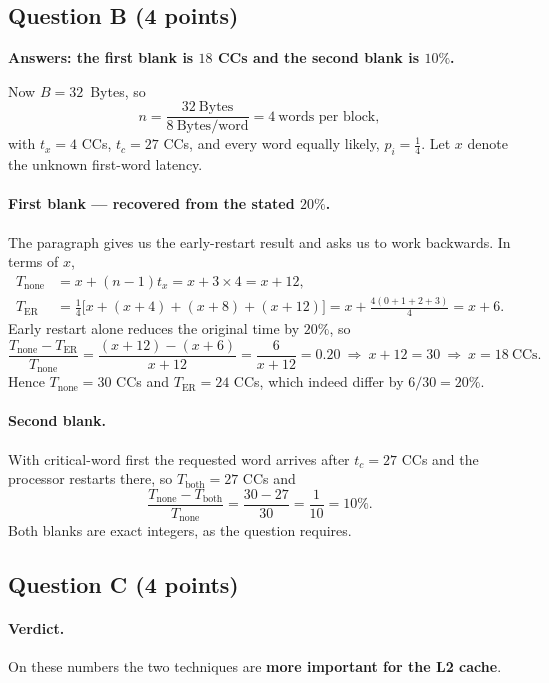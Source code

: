 \subsection*{Question B (4 points)}

\textbf{Answers: the first blank is $18$ CCs and the second blank is $10\%$.}

Now $B=32$~Bytes, so
\[
  n=\frac{32\ \text{Bytes}}{8\ \text{Bytes/word}}=4\ \text{words per block},
\]
with $t_x=4$ CCs, $t_c=27$ CCs, and every word equally likely, $p_i=\tfrac14$. Let $x$
denote the unknown first-word latency.

\paragraph{First blank --- recovered from the stated $20\%$.}
The paragraph gives us the early-restart result and asks us to work backwards. In terms
of $x$,
\begin{align*}
  T_{\text{none}} &= x+(n-1)t_x = x+3\times 4 = x+12,\\
  T_{\text{ER}}   &= \frac14\bigl[x+(x+4)+(x+8)+(x+12)\bigr]
                   = x+\frac{4(0+1+2+3)}{4} = x+6 .
\end{align*}
Early restart alone reduces the original time by $20\%$, so
\[
  \frac{T_{\text{none}}-T_{\text{ER}}}{T_{\text{none}}}
  =\frac{(x+12)-(x+6)}{x+12}
  =\frac{6}{x+12}=0.20
  \ \Longrightarrow\ x+12=30
  \ \Longrightarrow\ \boxed{x=18\ \text{CCs}} .
\]
Hence $T_{\text{none}}=30$ CCs and $T_{\text{ER}}=24$ CCs, which indeed differ by
$6/30=20\%$.

\paragraph{Second blank.}
With critical-word first the requested word arrives after $t_c=27$ CCs and the
processor restarts there, so $T_{\text{both}}=27$ CCs and
\[
  \frac{T_{\text{none}}-T_{\text{both}}}{T_{\text{none}}}
  =\frac{30-27}{30}=\frac{1}{10}=\boxed{10\%} .
\]
Both blanks are exact integers, as the question requires.

\subsection*{Question C (4 points)}

\paragraph{Verdict.} On these numbers the two techniques are \textbf{more important for
the L2 cache}.

